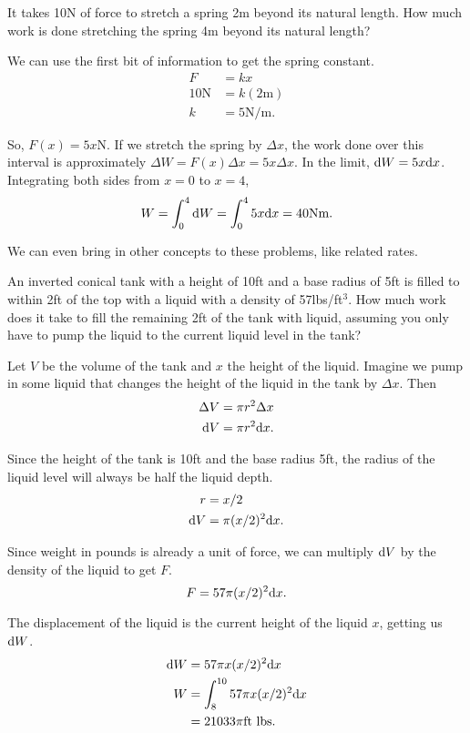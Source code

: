 \begin{example}
	It takes 10N of force to stretch a spring 2m beyond its natural length.
	How much work is done stretching the spring 4m beyond its natural length?
\end{example}
\begin{answer}
	We can use the first bit of information to get the spring constant.
	\begin{align*}
		F &= kx \\
		10\text{N} &= k(2\text{m}) \\
		k &= 5\text{N/m}.
	\end{align*}
	
	So, $F(x)=5x\text{N}$.
	If we stretch the spring by $\Delta x$, the work done over this interval is approximately $\Delta W = F(x)\Delta x= 5x\Delta x$.
	In the limit, $\mathrm{d} W = 5x\mathrm{d} x$.
	Integrating both sides from $x=0$ to $x=4$,
	\begin{equation*}
		W = \int_{0}^{4}{\mathrm{d} W} = \int_{0}^{4}{5x\mathrm{d} x} = 40\text{Nm}.
	\end{equation*}
\end{answer}


We can even bring in other concepts to these problems, like related rates.
\begin{example}
	An inverted conical tank with a height of 10ft and a base radius of 5ft is filled to within 2ft of the top with a liquid with a density of 57lbs/ft$^3$.
	How much work does it take to fill the remaining 2ft of the tank with liquid, assuming you only have to pump the liquid to the current liquid level in the tank?
\end{example}
\begin{answer}
	Let $V$ be the volume of the tank and $x$ the height of the liquid.
	Imagine we pump in some liquid that changes the height of the liquid in the tank by $\Delta x$.
	Then
	\begin{align*}
		\Delta V &= \pi r^2 \Delta x \\
		\mathrm{d} V &= \pi r^2 \mathrm{d} x.
	\end{align*}
	
	Since the height of the tank is 10ft and the base radius 5ft, the radius of the liquid level will always be half the liquid depth.
	\begin{align*}
		r &= x/2 \\
		\mathrm{d} V &= \pi (x/2)^2 \mathrm{d} x.
	\end{align*}
	
	Since weight in pounds is already a unit of force, we can multiply $\mathrm{d} V$ by the density of the liquid to get $F$.
	\begin{equation*}
		F = 57\pi(x/2)^2 \mathrm{d} x.
	\end{equation*}
	
	The displacement of the liquid is the current height of the liquid $x$, getting us $\mathrm{d} W$.
	\begin{align*}
		\mathrm{d} W &= 57\pi x(x/2)^2 \mathrm{d} x \\
		W &= \int_{8}^{10}{57\pi x(x/2)^2 \mathrm{d} x} \\
		&= 21033\pi \text{ft lbs}.
	\end{align*}
\end{answer}

